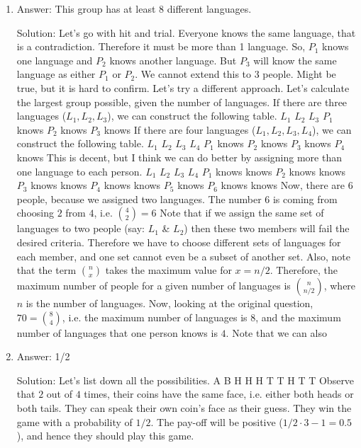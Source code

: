 \begin{enumerate}

\item
Answer: This group has at least 8 different languages.
 
Solution: Let's go with hit and trial.
Everyone knows the same language, that is a contradiction. Therefore it must be more than 1 language.
So, $P_1$ knows one language and $P_2$ knows another language. But $P_3$ will know the same language as either $P_1$ or $P_2$. We cannot extend this to 3 people.
Might be true, but it is hard to confirm.
Let's try a different approach. Let's calculate the largest group possible, given the number of languages.
If there are three languages ($L_1, L_2, L_3$), we can construct the following table.
$L_1$
$L_2$
$L_3$
$P_1$
knows
$P_2$
knows
$P_3$
knows
If there are four languages ($L_1, L_2, L_3, L_4$), we can construct the following table.
$L_1$
$L_2$
$L_3$
$L_4$
$P_1$
knows
$P_2$
knows
$P_3$
knows
$P_4$
knows
This is decent, but I think we can do better by assigning more than one language to each person.
$L_1$
$L_2$
$L_3$
$L_4$
$P_1$
knows
knows
$P_2$
knows
knows
$P_3$
knows
knows
$P_4$
knows
knows
$P_5$
knows
$P_6$
knows
knows
Now, there are $6$ people, because we assigned two languages. The number 6 is coming from choosing $2$ from $4$, i.e. $\binom{4}{2} = 6$
Note that if we assign the same set of languages to two people (say: $L_1$ \& $L_2$) then these two members will fail the desired criteria. Therefore we have to choose different sets of languages for each member, and one set cannot even be a subset of another set.
Also, note that the term $\binom{n}{x}$ takes the maximum value for $x = n/2$.
Therefore, the maximum number of people for a given number of languages is $\binom{n}{n/2}$, where $n$ is the number of languages.
Now, looking at the original question, $70 = \binom{8}{4}$, i.e. the maximum number of languages is $8$, and the maximum number of languages that one person knows is $4$.
Note that we can also




\item
Answer: 1/2
 
Solution: Let's list down all the possibilities.
A
B
H
H
H
T
T
H
T
T
Observe that $2$ out of $4$ times, their coins have the same face, i.e. either both heads or both tails.
They can speak their own coin's face as their guess. They win the game with a probability of $1/2$.
The pay-off will be positive ($1/2 \cdot 3 - 1 = 0.5$), and hence they should play this game.




\end{enumerate}
